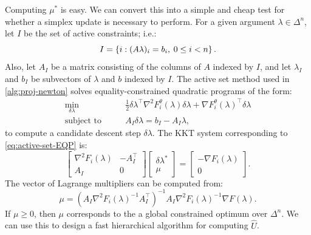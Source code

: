 \documentclass[eikonal.tex]{subfiles}
\begin{document}
Computing $\mu^*$ is easy. We can convert this into a simple and cheap
test for whether a simplex update is necessary to perform. For a given
argument $\lambda \in \Delta^n$, let $I$ be the set of active
constraints; i.e.:
\begin{equation}
  I = \left\{i : (A\lambda)_i = b_i, \hspace{0.25em} 0 \leq i < n\right\}.
\end{equation}
Also, let $A_I$ be a matrix consisting of the columns of $A$ indexed
by $I$, and let $\lambda_I$ and $b_I$ be subvectors of $\lambda$ and
$b$ indexed by $I$. The active set method used in
\cref{alg:proj-newton} solves equality-constrained quadratic programs
of the form:
\begin{equation}
  \label{eq:active-set-EQP}
  \begin{split}
    \min_{\delta \lambda} &\qquad \frac{1}{2} \delta \lambda^\top \nabla^2 F_i^\theta (\lambda) \delta \lambda + \nabla F_i^\theta(\lambda)^\top \delta \lambda \\
    \text{subject to} &\qquad A_I \delta \lambda = b_I - A_I \lambda,
  \end{split}
\end{equation}
to compute a candidate descent step $\delta \lambda$. The KKT system
corresponding to \cref{eq:active-set-EQP} is:
\begin{equation}
  \begin{bmatrix}
    \nabla^2 F_i (\lambda) & -A_I^\top \\
    A_I & 0
  \end{bmatrix} \begin{bmatrix}
    \delta\lambda^* \\ \mu
  \end{bmatrix} = \begin{bmatrix}
    -\nabla F_i(\lambda) \\ 0
  \end{bmatrix}.
\end{equation}
The vector of Lagrange multipliers can be computed from:
\begin{equation}
  \mu = {(A_I \nabla^2 F_i(\lambda)^{-1} A_I^\top)}^{-1} A_I \nabla^2 F_i(\lambda)^{-1} \nabla F(\lambda).
\end{equation}
If $\mu \geq 0$, then $\mu$ corresponds to the a global constrained
optimum over $\Delta^n$. We can use this to design a fast hierarchical
algorithm for computing $\hat{U}$.
\end{document}
